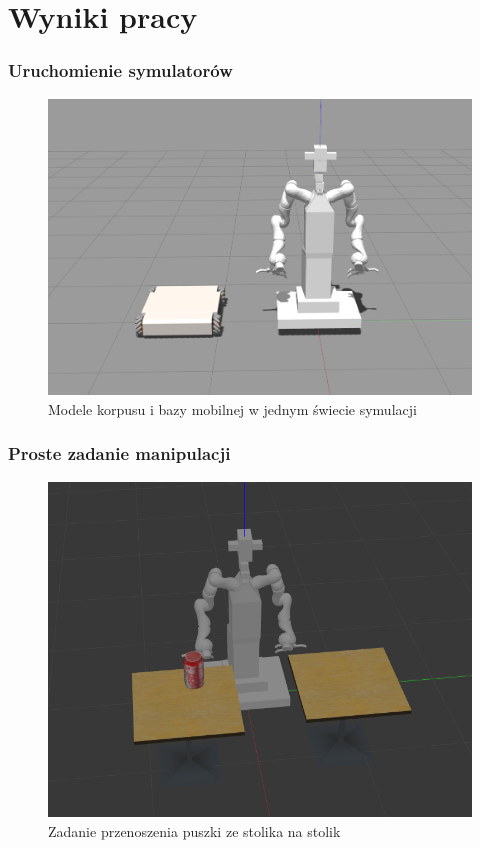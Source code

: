 \section{Wyniki pracy}


\begin{frame}
    \frametitle{Uruchomienie symulatorów}
    \begin{figure}
        \includegraphics[scale=0.20]{./images/velma+omnivelma_cropped.png}
        \caption{Modele korpusu i bazy mobilnej w jednym świecie symulacji}
    \end{figure}
\end{frame}


\begin{frame}
    \frametitle{Proste zadanie manipulacji}
    \begin{figure}
        \includegraphics[scale=0.35]{./images/velma_stero_task.png}
        \caption{Zadanie przenoszenia puszki ze stolika na stolik}
    \end{figure}
\end{frame}

